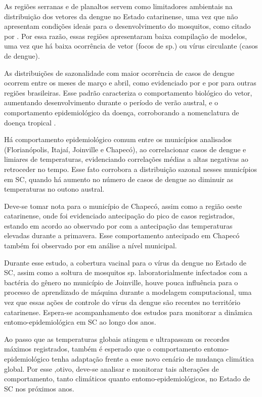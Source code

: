 \indent As regiões serranas e de planaltos servem como limitadores ambientais na distribuição dos vetores da dengue no Estado catarinense, uma vez que não apresentam condições ideais para o desenvolvimento do mosquitos, como citado por . Por essa razão, essas regiões apresentaram baixa compilação de modelos, uma vez que há baixa ocorrência de vetor (focos de  sp.) ou vírus circulante (casos de dengue).

\indent As distribuições de sazonalidade com maior ocorrência de casos de dengue ocorrem entre os meses de março e abril, como evidenciado por  e por  para outras regiões brasileiras. Esse padrão caracteriza o comportamento biológico do vetor, aumentando desenvolvimento durante o período de verão austral, e o comportamento epidemiológico da doença, corroborando a nomenclatura de doença tropical \cite{Valle2015Dengue}.

\indent Há comportamento epidemiológico comum entre os municípios analisados (Florianópolis, Itajaí, Joinville e Chapecó), ao correlacionar casos de dengue e limiares de temperaturas, evidenciando correlações médias a altas negativas ao retroceder no tempo. Esse fato corrobora a distribuição sazonal nesses municípios em \acrlong{SC}, quando há aumento no número de casos de dengue ao diminuir as temperaturas no outono austral. 

\indent Deve-se tomar nota para o município de Chapecó, assim como a região oeste catarinense, onde foi evidenciado antecipação do pico de casos registrados, estando em acordo ao observado por  com a antecipação das temperaturas elevadas durante a primavera. Esse comportamento antecipado em Chapecó também foi observado por  em análise a nível municipal.

\indent Durante esse estudo, a cobertura vacinal para o vírus da dengue no Estado de \acrlong{SC}, assim como a soltura de mosquitos  sp. laboratorialmente infectados com a bactéria do gênero  no município de Joinville, houve pouca influência para o processo de aprendizado de máquina durante a modelagem computacional, uma vez que essas ações de controle do vírus da dengue são recentes no território catarinense. Espera-se acompanhamento dos estudos para monitorar a dinâmica entomo-epidemiológica em \acrlong{SC} ao longo dos anos.

\indent Ao passo que as temperaturas globais atingem e ultrapassam os recordes máximos registrados, também é esperado que o comportamento entomo-epidemiológico tenha adaptação frente a esse novo cenário de mudança climática global. Por esse ,otivo, deve-se analisar e monitorar tais alterações de comportamento, tanto climáticos quanto entomo-epidemiológicos, no Estado de \acrlong{SC} nos próximos anos.


